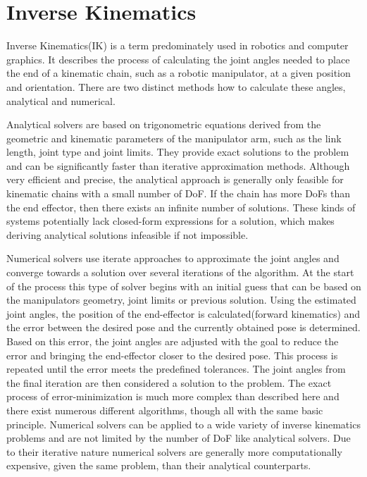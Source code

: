 \section{Inverse Kinematics}
Inverse Kinematics(IK) is a term predominately used in robotics and computer graphics.
It describes the process of calculating the joint angles needed to place the end of a kinematic chain, such as a robotic manipulator, at a given position and orientation.
There are two distinct methods how to calculate these angles, analytical and numerical.

Analytical solvers are based on trigonometric equations derived from the geometric and kinematic parameters of the manipulator arm, such as the link length, joint type and joint limits.
They provide exact solutions to the problem and can be significantly faster than iterative approximation methods.
Although very efficient and precise, the analytical approach is generally only feasible for kinematic chains with a small number of DoF.
If the chain has more DoFs than the end effector, then there exists an infinite number of solutions.
These kinds of systems potentially lack closed-form expressions for a solution, which makes deriving analytical solutions infeasible if not impossible.


Numerical solvers use iterate approaches to approximate the joint angles and converge towards a solution over several iterations of the algorithm.
At the start of the process this type of solver begins with an initial guess that can be based on the manipulators geometry, joint limits or previous solution.
Using the estimated joint angles, the position of the end-effector is calculated(forward kinematics) and the error between the desired pose and the currently obtained pose is determined.
Based on this error, the joint angles are adjusted with the goal to reduce the error and bringing the end-effector closer to the desired pose.
This process is repeated until the error meets the predefined tolerances.
The joint angles from the final iteration are then considered a solution to the problem.
The exact process of error-minimization is much more complex than described here and there exist numerous different algorithms, though all with the same basic principle.
Numerical solvers can be applied to a wide variety of inverse kinematics problems and are not limited by the number of DoF like analytical solvers.
Due to their iterative nature numerical solvers are generally more computationally expensive, given the same problem, than their analytical counterparts.






